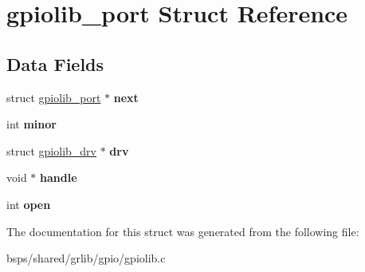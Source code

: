 \hypertarget{structgpiolib__port}{}\section{gpiolib\+\_\+port Struct Reference}
\label{structgpiolib__port}
\subsection*{Data Fields}
\begin{DoxyCompactItemize}
\item 
\mbox{\label{structgpiolib__port_a9783c465802992580bb5d8d2adb0f9b3}} 
struct \mbox{\hyperlink{structgpiolib__port}{gpiolib\+\_\+port}} $\ast$ {\bfseries next}
\item 
\mbox{\label{structgpiolib__port_ac3a2fa723b652e41d066f21ab62e00ec}} 
int {\bfseries minor}
\item 
\mbox{\label{structgpiolib__port_a2a1367ba81cae2d500ec9f6525251ef9}} 
struct \mbox{\hyperlink{structgpiolib__drv}{gpiolib\+\_\+drv}} $\ast$ {\bfseries drv}
\item 
\mbox{\label{structgpiolib__port_a0679b779a2b5b8d4afec1aad02ddfd87}} 
void $\ast$ {\bfseries handle}
\item 
\mbox{\label{structgpiolib__port_ae0c8af862ccb1f832557aece481a27b6}} 
int {\bfseries open}
\end{DoxyCompactItemize}


The documentation for this struct was generated from the following file\+:\begin{DoxyCompactItemize}
\item 
bsps/shared/grlib/gpio/gpiolib.\+c\end{DoxyCompactItemize}
